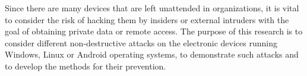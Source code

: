Since there are many devices that are left unattended in organizations, it is vital to consider the risk of hacking them by insiders or external intruders with the goal of obtaining private data or remote access. The purpose of this research is to consider different non-destructive attacks on the electronic devices running Windows, Linux or Android operating systems, to demonstrate such attacks and to develop the methods for their prevention.
